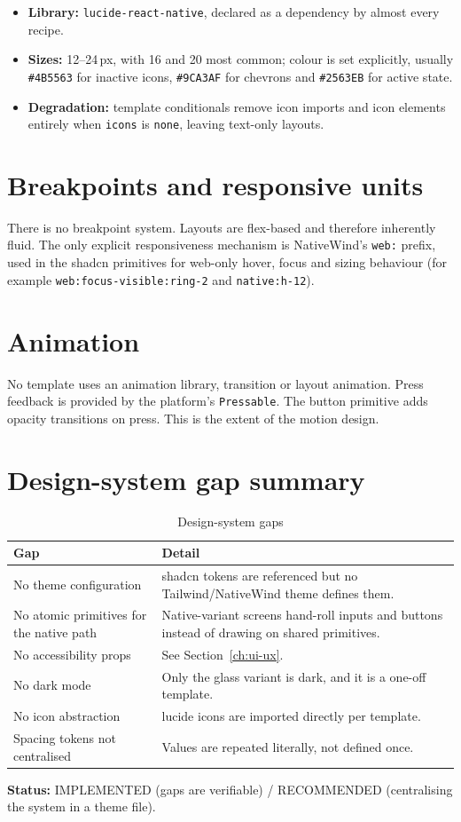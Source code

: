 \begin{itemize}
  \item \textbf{Library:} \texttt{lucide-react-native}, declared as a dependency by
        almost every recipe.
  \item \textbf{Sizes:} 12--24\,px, with 16 and 20 most common; colour is set
        explicitly, usually \texttt{\#4B5563} for inactive icons, \texttt{\#9CA3AF}
        for chevrons and \texttt{\#2563EB} for active state.
  \item \textbf{Degradation:} template conditionals remove icon imports and icon
        elements entirely when \texttt{icons} is \texttt{none}, leaving text-only
        layouts.
\end{itemize}

\section{Breakpoints and responsive units}

There is no breakpoint system. Layouts are flex-based and therefore inherently
fluid. The only explicit responsiveness mechanism is NativeWind's \texttt{web:}
prefix, used in the shadcn primitives for web-only hover, focus and sizing
behaviour (for example \texttt{web:focus-visible:ring-2} and
\texttt{native:h-12}).

\section{Animation}

No template uses an animation library, transition or layout animation. Press
feedback is provided by the platform's \texttt{Pressable}. The button primitive
adds opacity transitions on press. This is the extent of the motion design.

\section{Design-system gap summary}

\begin{table}[H]
\centering
\caption{Design-system gaps}
\begin{tabular}{p{4.6cm}p{9.2cm}}
\toprule
\textbf{Gap} & \textbf{Detail} \\
\midrule
No theme configuration & shadcn tokens are referenced but no Tailwind/NativeWind
theme defines them. \\
No atomic primitives for the native path & Native-variant screens hand-roll inputs
and buttons instead of drawing on shared primitives. \\
No accessibility props & See Section~\ref{ch:ui-ux}. \\
No dark mode & Only the glass variant is dark, and it is a one-off template. \\
No icon abstraction & lucide icons are imported directly per template. \\
Spacing tokens not centralised & Values are repeated literally, not defined once. \\
\bottomrule
\end{tabular}
\end{table}

\textbf{Status:} IMPLEMENTED (gaps are verifiable) / RECOMMENDED (centralising the
system in a theme file).
